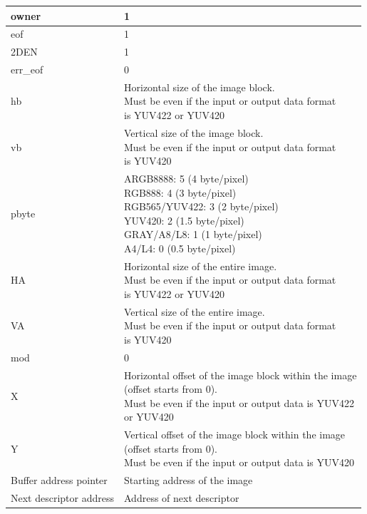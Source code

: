\documentclass[main\_\_EN.tex]{subfiles}
\begin{document}
\begin{longtable}[c]{ |p{2.5cm}|p{8cm}| }
        owner & 1 \\\hline
        eof & 1 \\\hline
        2DEN & 1 \\\hline
        err\_eof & 0 \\\hline
        hb & \makecell[l]{Horizontal size of the image block.\\ Must be even if the input or output data format \\is YUV422 or YUV420} \\\hline
        vb & \makecell[l]{Vertical size of the image block.\\ Must be even if the input or output data format \\is YUV420} \\\hline
        pbyte & \makecell[l]{ARGB8888: 5 (4 byte/pixel)\\RGB888: 4 (3 byte/pixel)\\RGB565/YUV422: 3 (2 byte/pixel)\\YUV420: 2 (1.5 byte/pixel)\\GRAY/A8/L8: 1 (1 byte/pixel)\\A4/L4: 0 (0.5 byte/pixel)}  \\\hline
        HA & \makecell[l]{Horizontal size of the entire image.\\ Must be even if the input or output data format \\is YUV422 or YUV420} \\\hline
        VA & \makecell[l]{Vertical size of the entire image.\\ Must be even if the input or output data format \\is YUV420} \\\hline
        mod & 0 \\\hline
        X & \makecell[l]{Horizontal offset of the image block within the image \\(offset starts from 0).\\ Must be even if the input or output data is YUV422 \\or YUV420} \\\hline
        Y & \makecell[l]{Vertical offset of the image block within the image \\(offset starts from 0). \\Must be even if the input or output data is YUV420} \\\hline
        Buffer address pointer & Starting address of the image \\\hline
        Next descriptor address & Address of next descriptor \\\hline

\end{longtable}
\end{document}
